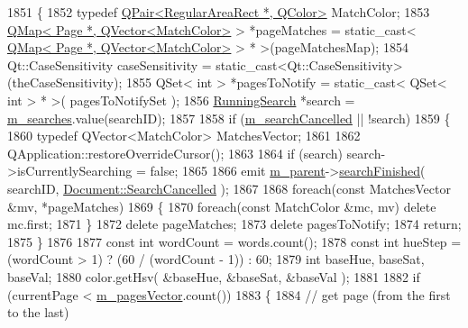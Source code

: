 \begin{DoxyCode}
1851 \{
1852     \textcolor{keyword}{typedef} \hyperlink{structQPair}{QPair<RegularAreaRect *, QColor>} MatchColor;
1853     \hyperlink{classQMap}{QMap< Page *, QVector<MatchColor>} > *pageMatches = \textcolor{keyword}{static\_cast<} 
      \hyperlink{classQMap}{QMap< Page *, QVector<MatchColor>} \textcolor{keyword}{>} * >(pageMatchesMap);
1854     Qt::CaseSensitivity caseSensitivity = \textcolor{keyword}{static\_cast<}Qt::CaseSensitivity\textcolor{keyword}{>}(theCaseSensitivity);
1855     QSet< int > *pagesToNotify = \textcolor{keyword}{static\_cast<} QSet< int > * \textcolor{keyword}{>}( pagesToNotifySet );
1856     \hyperlink{structRunningSearch}{RunningSearch} *search = \hyperlink{classOkular_1_1DocumentPrivate_a42420dd45075092b921a829b8e9f2214}{m\_searches}.value(searchID);
1857 
1858     \textcolor{keywordflow}{if} (\hyperlink{classOkular_1_1DocumentPrivate_ad852d630ad63f8fd4ce1b2cc93179c91}{m\_searchCancelled} || !search)
1859     \{
1860         \textcolor{keyword}{typedef} QVector<MatchColor> MatchesVector;
1861 
1862         QApplication::restoreOverrideCursor();
1863 
1864         \textcolor{keywordflow}{if} (search) search->isCurrentlySearching = \textcolor{keyword}{false};
1865 
1866         emit \hyperlink{classOkular_1_1DocumentPrivate_ac921eda41c014869ffec96ecc569c713}{m\_parent}->\hyperlink{classOkular_1_1Document_ae938c994d20bdfef40caa3d37d28d92d}{searchFinished}( searchID, 
      \hyperlink{classOkular_1_1Document_aa9c2934f6abce7b0440ec74bb56eefbbacc76ba5b7c23f4d24515076e946373b4}{Document::SearchCancelled} );
1867 
1868         \textcolor{keywordflow}{foreach}(\textcolor{keyword}{const} MatchesVector &mv, *pageMatches)
1869         \{
1870             \textcolor{keywordflow}{foreach}(\textcolor{keyword}{const} MatchColor &mc, mv) \textcolor{keyword}{delete} mc.first;
1871         \}
1872         \textcolor{keyword}{delete} pageMatches;
1873         \textcolor{keyword}{delete} pagesToNotify;
1874         \textcolor{keywordflow}{return};
1875     \}
1876 
1877     \textcolor{keyword}{const} \textcolor{keywordtype}{int} wordCount = words.count();
1878     \textcolor{keyword}{const} \textcolor{keywordtype}{int} hueStep = (wordCount > 1) ? (60 / (wordCount - 1)) : 60;
1879     \textcolor{keywordtype}{int} baseHue, baseSat, baseVal;
1880     color.getHsv( &baseHue, &baseSat, &baseVal );
1881 
1882     \textcolor{keywordflow}{if} (currentPage < \hyperlink{classOkular_1_1DocumentPrivate_a73b852d9a73ffe8061b66dbf9b290f17}{m\_pagesVector}.count())
1883     \{
1884         \textcolor{comment}{// get page (from the first to the last)}

\end{DoxyCode}
